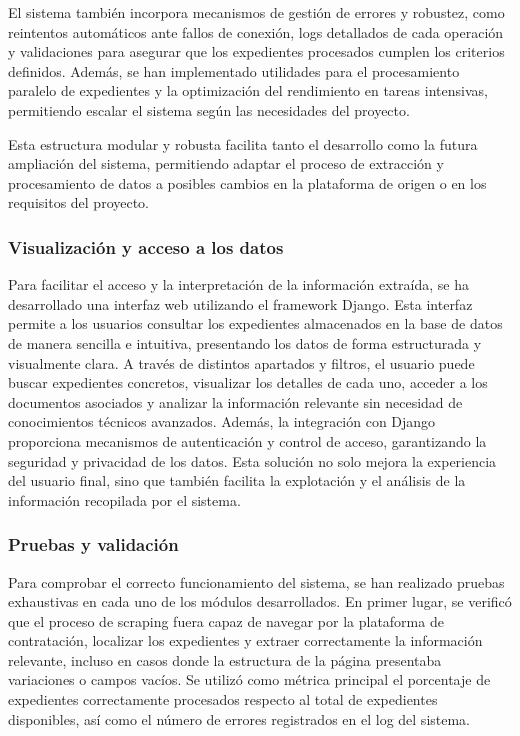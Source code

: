 \documentclass{article}
\begin{document}
El sistema también incorpora mecanismos de gestión de errores y robustez, como reintentos automáticos ante fallos de conexión, logs detallados de cada operación y validaciones para asegurar que los expedientes procesados cumplen los criterios definidos. Además, se han implementado utilidades para el procesamiento paralelo de expedientes y la optimización del rendimiento en tareas intensivas, permitiendo escalar el sistema según las necesidades del proyecto.

Esta estructura modular y robusta facilita tanto el desarrollo como la futura ampliación del sistema, permitiendo adaptar el proceso de extracción y procesamiento de datos a posibles cambios en la plataforma de origen o en los requisitos del proyecto.


\subsubsection{Visualización y acceso a los datos}
Para facilitar el acceso y la interpretación de la información extraída, se ha desarrollado una interfaz web utilizando el framework Django. Esta interfaz permite a los usuarios consultar los expedientes almacenados en la base de datos de manera sencilla e intuitiva, presentando los datos de forma estructurada y visualmente clara. A través de distintos apartados y filtros, el usuario puede buscar expedientes concretos, visualizar los detalles de cada uno, acceder a los documentos asociados y analizar la información relevante sin necesidad de conocimientos técnicos avanzados. Además, la integración con Django proporciona mecanismos de autenticación y control de acceso, garantizando la seguridad y privacidad de los datos. Esta solución no solo mejora la experiencia del usuario final, sino que también facilita la explotación y el análisis de la información recopilada por el sistema.

\subsubsection{Pruebas y validación}
Para comprobar el correcto funcionamiento del sistema, se han realizado pruebas exhaustivas en cada uno de los módulos desarrollados. En primer lugar, se verificó que el proceso de scraping fuera capaz de navegar por la plataforma de contratación, localizar los expedientes y extraer correctamente la información relevante, incluso en casos donde la estructura de la página presentaba variaciones o campos vacíos. Se utilizó como métrica principal el porcentaje de expedientes correctamente procesados respecto al total de expedientes disponibles, así como el número de errores registrados en el log del sistema.
\end{document}
